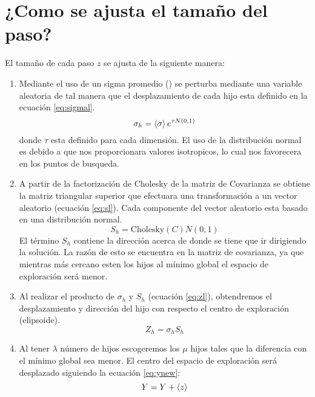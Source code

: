 \section{¿Como se ajusta el tamaño del paso?}
El tamaño de cada paso $z$ se ajusta de la siguiente manera:
\begin{enumerate}
  \item Mediante el uso de un sigma promedio (\prom{\sigma}) se perturba mediante una variable aleatoria de tal manera que el desplazamiento de cada hijo esta definido en la ecuación \ref{eq:sigmal}.
        \begin{equation}
          \sigma_h = \left\langle \sigma \right\rangle e^{\tau N(0,1)}
          \label{eq:sigmal}
        \end{equation}
        donde $\tau$ esta definido para cada dimensión. El uso de la distribución normal es debido a que nos proporcionara valores isotropicos, lo cual nos favorecera en los puntos de busqueda.\cite{conference_hansen_2013_page_18}
  \item A partir de la factorización de Cholesky de la matriz de Covarianza se obtiene la matriz triangular superior que efectuara una transformación a un vector aleatorio (ecuación \ref{eq:sl}). Cada componente del vector aleatorio esta basado en una distribución normal.
        \begin{equation}
          S_h = \text{Cholesky}(C)N(0,1)
          \label{eq:sl}
        \end{equation}
        El término $S_h$ contiene la dirección acerca de donde se tiene que ir dirigiendo la solución. La razón de esto se encuentra en la matriz de covarianza, ya que mientras más cercano esten los hijos al mínimo global el espacio de exploración será menor.
  \item  Al realizar el producto de $\sigma_h$ y $S_h$ (ecuación \ref{eq:zl}), obtendremos el desplazamiento y dirección del hijo con respecto el centro de exploración (elipsoide).
        \begin{equation}
          Z_h = \sigma_h S_h
          \label{eq:zl}
        \end{equation}
  \item Al tener $\lambda$ número de hijos escogeremos los $\mu$ hijos tales que la diferencia con el mínimo global sea menor. El centro del espacio de exploración será desplazado siguiendo la ecuación \ref{eq:ynew}:
        \begin{equation}
          Y=Y+\left\langle z \right\rangle
          \label{eq:ynew}
        \end{equation}

\end{enumerate}
